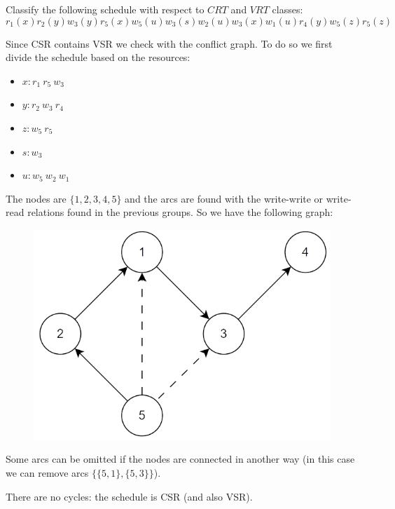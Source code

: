 \documentclass[12pt, a4paper]{report}
\newtheorem[style=M,bodystyle=\normalfont]{theorem}{Theorem}
\newtheorem[style=M,bodystyle=\normalfont]{corollary}{Corollary}
\newtheorem[style=M,bodystyle=\normalfont]{lemma}{Lemma}
\newtheorem[style=M,bodystyle=\normalfont]{definition}{Definition}
\begin{document}
    \newpage
    
    \begin{Exercise}[label=3]
        Classify the following schedule with respect to $CRT$ and $VRT$ classes: 
        \[r_1(x) r_2(y) w_3(y) r_5(x) w_5(u) w_3(s)w_2(u) w_3(x) w_1(u) r_4(y) w_5(z) r_5(z)\]
    \end{Exercise}
    \begin{Answer}[ref=3]
        Since CSR contains VSR we check with the conflict graph. To do so we first divide the schedule based on the resources: 
        \begin{itemize}
            \item $x: r_1 \: r_5 \:w_3$
            \item $y: r_2 \: w_3 \:r_4$
            \item $z: w_5 \: r_5$
            \item $s: w_3$
            \item $u: w_5 \: w_2 \:w_1$
        \end{itemize}
        The nodes are $\{1,2,3,4,5\}$ and the arcs are found with the write-write or write-read relations found in the previous groups. So we have the following graph:
        \begin{figure}[H]
            \centering
            \includegraphics[width=0.5\linewidth]{images/conflictgraph.png}
        \end{figure}
        Some arcs can be omitted if the nodes are connected in another way (in this case we can remove arcs $\{\{5,1\},\{5,3\}\}$). 

        There are no cycles: the schedule is CSR (and also VSR). 
    \end{Answer}

    \newpage
    
\end{document}
